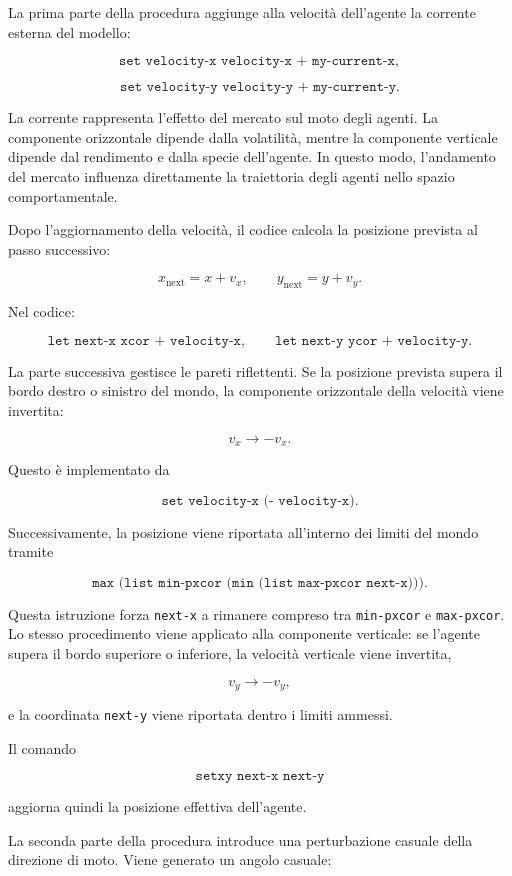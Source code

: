 La prima parte della procedura aggiunge alla velocità dell'agente la corrente
esterna del modello:

\[
\texttt{set velocity-x velocity-x + my-current-x},
\]

\[
\texttt{set velocity-y velocity-y + my-current-y}.
\]

La corrente rappresenta l'effetto del mercato sul moto degli agenti. La
componente orizzontale dipende dalla volatilità, mentre la componente verticale
dipende dal rendimento e dalla specie dell'agente. In questo modo, l'andamento
del mercato influenza direttamente la traiettoria degli agenti nello spazio
comportamentale.

Dopo l'aggiornamento della velocità, il codice calcola la posizione prevista al
passo successivo:

\[
x_{\mathrm{next}} = x + v_x,
\qquad
y_{\mathrm{next}} = y + v_y.
\]

Nel codice:

\[
\texttt{let next-x xcor + velocity-x},
\qquad
\texttt{let next-y ycor + velocity-y}.
\]

La parte successiva gestisce le pareti riflettenti. Se la posizione prevista
supera il bordo destro o sinistro del mondo, la componente orizzontale della
velocità viene invertita:

\[
v_x \longrightarrow -v_x.
\]

Questo è implementato da

\[
\texttt{set velocity-x (- velocity-x)}.
\]

Successivamente, la posizione viene riportata all'interno dei limiti del mondo
tramite

\[
\texttt{max (list min-pxcor (min (list max-pxcor next-x)))}.
\]

Questa istruzione forza \texttt{next-x} a rimanere compreso tra
\texttt{min-pxcor} e \texttt{max-pxcor}. Lo stesso procedimento viene applicato
alla componente verticale: se l'agente supera il bordo superiore o inferiore, la
velocità verticale viene invertita,

\[
v_y \longrightarrow -v_y,
\]

e la coordinata \texttt{next-y} viene riportata dentro i limiti ammessi.

Il comando

\[
\texttt{setxy next-x next-y}
\]

aggiorna quindi la posizione effettiva dell'agente.

La seconda parte della procedura introduce una perturbazione casuale della
direzione di moto. Viene generato un angolo casuale:

